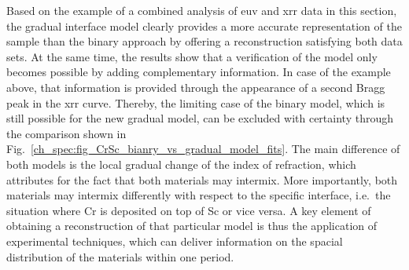 Based on the example of a combined analysis of \gls{euv} and \gls{xrr} data in this section, the gradual interface model clearly provides a more accurate representation of the sample than the binary approach by offering a reconstruction satisfying both data sets. At the same time, the results show that a verification of the model only becomes possible by adding complementary information. In case of the example above, that information is provided through the appearance of a second Bragg peak in the \gls{xrr} curve. Thereby, the limiting case of the binary model, which is still possible for the new gradual model, can be excluded with certainty through the comparison shown in Fig.~\ref{ch_spec:fig_CrSc_bianry_vs_gradual_model_fits}. The main difference of both models is the local gradual change of the index of refraction, which attributes for the fact that both materials may intermix. More importantly, both materials may intermix differently with respect to the specific interface, i.e.~the situation where Cr is deposited on top of Sc or vice versa. A key element of obtaining a reconstruction of that particular model is thus the application of experimental techniques, which can deliver information on the spacial distribution of the materials within one period.

